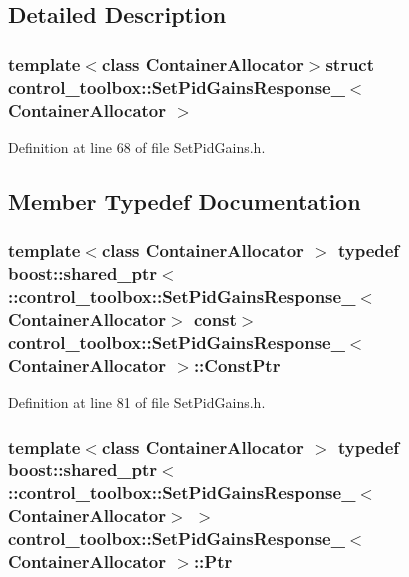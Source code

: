 \subsection{\-Detailed \-Description}
\subsubsection*{template$<$class Container\-Allocator$>$struct control\-\_\-toolbox\-::\-Set\-Pid\-Gains\-Response\-\_\-$<$ Container\-Allocator $>$}



\-Definition at line 68 of file \-Set\-Pid\-Gains.\-h.



\subsection{\-Member \-Typedef \-Documentation}
\subsubsection[{\-Const\-Ptr}]{\setlength{\rightskip}{0pt plus 5cm}template$<$class Container\-Allocator $>$ typedef boost\-::shared\-\_\-ptr$<$ \-::{\bf control\-\_\-toolbox\-::\-Set\-Pid\-Gains\-Response\-\_\-}$<$\-Container\-Allocator$>$ const$>$ {\bf control\-\_\-toolbox\-::\-Set\-Pid\-Gains\-Response\-\_\-}$<$ \-Container\-Allocator $>$\-::{\bf \-Const\-Ptr}}\label{structcontrol__toolbox_1_1SetPidGainsResponse___af4d5fa0923428bc4de24dfa52882adb5}


\-Definition at line 81 of file \-Set\-Pid\-Gains.\-h.

\subsubsection[{\-Ptr}]{\setlength{\rightskip}{0pt plus 5cm}template$<$class Container\-Allocator $>$ typedef boost\-::shared\-\_\-ptr$<$ \-::{\bf control\-\_\-toolbox\-::\-Set\-Pid\-Gains\-Response\-\_\-}$<$\-Container\-Allocator$>$ $>$ {\bf control\-\_\-toolbox\-::\-Set\-Pid\-Gains\-Response\-\_\-}$<$ \-Container\-Allocator $>$\-::{\bf \-Ptr}}\label{structcontrol__toolbox_1_1SetPidGainsResponse___a98d5369fc9a594e63343d750c2b42224}


